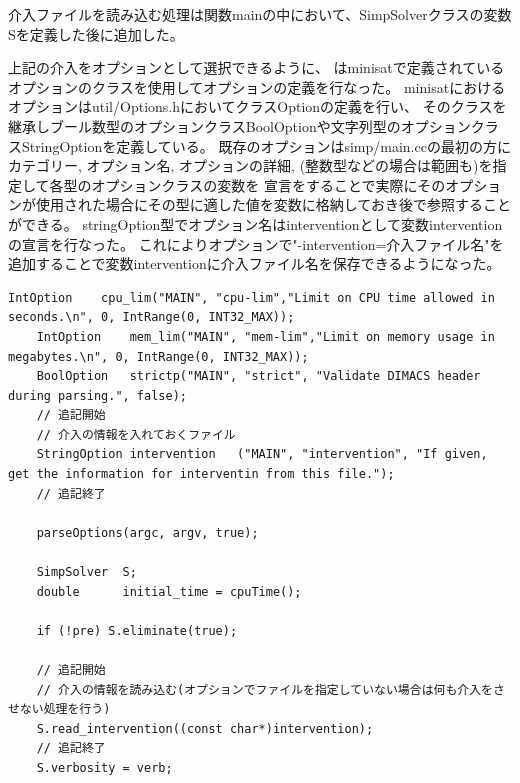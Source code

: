 介入ファイルを読み込む処理は関数mainの中において、SimpSolverクラスの変数Sを定義した後に追加した。

上記の介入をオプションとして選択できるように、
はminisatで定義されているオプションのクラスを使用してオプションの定義を行なった。
minisatにおけるオプションはutil/Options.hにおいてクラスOptionの定義を行い、
そのクラスを継承しブール数型のオプションクラスBoolOptionや文字列型のオプションクラスStringOptionを定義している。
既存のオプションはsimp/main.ccの最初の方に
カテゴリー, オプション名, オプションの詳細, (整数型などの場合は範囲も)を指定して各型のオプションクラスの変数を
宣言をすることで実際にそのオプションが使用された場合にその型に適した値を変数に格納しておき後で参照することができる。
stringOption型でオプション名はinterventionとして変数interventionの宣言を行なった。
これによりオプションで"-intervention=介入ファイル名"を追加することで変数interventionに介入ファイル名を保存できるようになった。
\begin{lstlisting}[caption=介入ファイルの読み込みとオプションの選択をするための関数mainへの変更(core/Solver.cc), firstnumber=66]
	IntOption    cpu_lim("MAIN", "cpu-lim","Limit on CPU time allowed in seconds.\n", 0, IntRange(0, INT32_MAX));
    IntOption    mem_lim("MAIN", "mem-lim","Limit on memory usage in megabytes.\n", 0, IntRange(0, INT32_MAX));
    BoolOption   strictp("MAIN", "strict", "Validate DIMACS header during parsing.", false);
	// 追記開始
	// 介入の情報を入れておくファイル
    StringOption intervention   ("MAIN", "intervention", "If given, get the information for interventin from this file.");
	// 追記終了

    parseOptions(argc, argv, true);
        
    SimpSolver  S;
    double      initial_time = cpuTime();

    if (!pre) S.eliminate(true);

	// 追記開始
	// 介入の情報を読み込む(オプションでファイルを指定していない場合は何も介入をさせない処理を行う)
    S.read_intervention((const char*)intervention);
	// 追記終了
    S.verbosity = verb;
\end{lstlisting}


